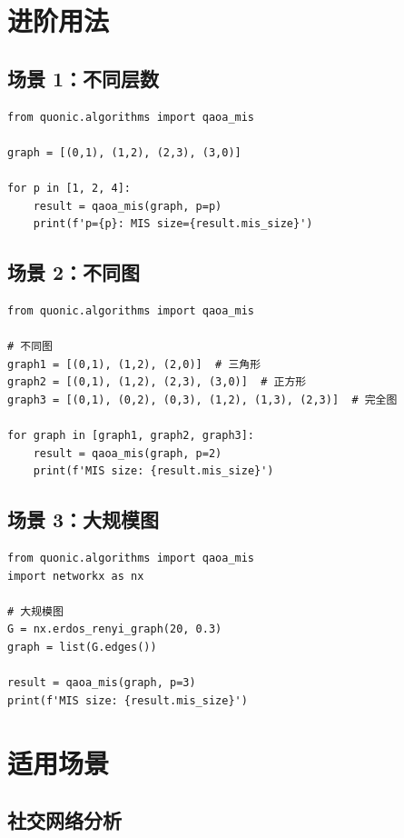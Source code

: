 \documentclass[12pt,a4paper]{article}
\begin{document}
\section{进阶用法}

\subsection{场景 1：不同层数}

\begin{verbatim}
from quonic.algorithms import qaoa_mis

graph = [(0,1), (1,2), (2,3), (3,0)]

for p in [1, 2, 4]:
    result = qaoa_mis(graph, p=p)
    print(f'p={p}: MIS size={result.mis_size}')
\end{verbatim}

\subsection{场景 2：不同图}

\begin{verbatim}
from quonic.algorithms import qaoa_mis

# 不同图
graph1 = [(0,1), (1,2), (2,0)]  # 三角形
graph2 = [(0,1), (1,2), (2,3), (3,0)]  # 正方形
graph3 = [(0,1), (0,2), (0,3), (1,2), (1,3), (2,3)]  # 完全图

for graph in [graph1, graph2, graph3]:
    result = qaoa_mis(graph, p=2)
    print(f'MIS size: {result.mis_size}')
\end{verbatim}

\subsection{场景 3：大规模图}

\begin{verbatim}
from quonic.algorithms import qaoa_mis
import networkx as nx

# 大规模图
G = nx.erdos_renyi_graph(20, 0.3)
graph = list(G.edges())

result = qaoa_mis(graph, p=3)
print(f'MIS size: {result.mis_size}')
\end{verbatim}

\section{适用场景}

\subsection{社交网络分析}
\end{document}

